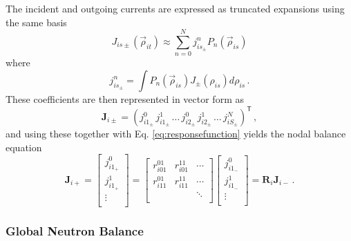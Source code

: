 The incident and outgoing currents are expressed as
truncated expansions using the same basis
\begin{equation}
  J_{is\pm}(\vec{\rho}_{it}) \approx \sum^{N}_{n=0}  
    j^n_{is_\pm} P_n (\vec{\rho}_{is}) 
\end{equation}
where
\begin{equation}
      j^n_{is_\pm} = \int  P_n (\vec{\rho}_{is}) 
        J_{\pm} (\rho_{is}) d \rho_{is} \, .
\end{equation}
These coefficients are then represented in vector form as
\begin{equation}
  \mathbf{J}_{i\pm} = ( j^0_{i1_\pm} \, j^1_{i1_\pm} \, \ldots \, 
    j^0_{i2_\pm} \, j^1_{i2_\pm} \, \ldots \, j^N_{iS_\pm} )^\mathsf{T} \, ,
\end{equation}
and using these together with Eq. \ref{eq:responsefunction} yields
the nodal balance equation
\begin{equation}
    \mathbf{J}_{i+} = \left [\begin{array}{c}
      j^0_{i1_+}    \\
      j^1_{i1_+}    \\
      \vdots        \\
    \end{array} 
    \right ] = \left [\begin{array}{ccc}
       r^{01}_{i01} &  r^{11}_{i01}  &  \cdots   \\
       r^{01}_{i11} &  r^{11}_{i11}  &  \cdots   \\
                    &                &  \ddots   \\
    \end{array} 
    \right ] \left [\begin{array}{c}
      j^0_{i1_-}       \\
      j^1_{i1_-}       \\
      \vdots           \\
    \end{array} 
    \right ] = \mathbf{R}_i\mathbf{J}_{i-} \, .
  \label{eq:elementresponse}
\end{equation}

\subsubsection{Global Neutron Balance}

